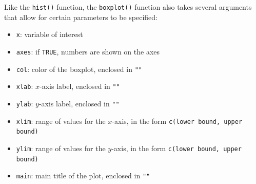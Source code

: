 \documentclass{report}\usepackage[]{graphicx}\usepackage[]{color}
\begin{document}
Like the \texttt{hist()} function, the \texttt{boxplot()} function also takes several arguments that allow for certain parameters to be specified:
\begin{itemize}
\item \texttt{x}: variable of interest
\item \texttt{axes}: if \texttt{TRUE}, numbers are shown on the axes
\item \texttt{col}: color of the boxplot, enclosed in \texttt{""}
\item \texttt{xlab}: $x$-axis label, enclosed in \texttt{""}
\item \texttt{ylab}: $y$-axis label, enclosed in \texttt{""}
\item \texttt{xlim}: range of values for the $x$-axis, in the form \texttt{c(lower bound, upper bound)}
\item \texttt{ylim}: range of values for the $y$-axis, in the form \texttt{c(lower bound, upper bound)}
\item \texttt{main}: main title of the plot, enclosed in \texttt{""} 

\end{itemize}


\end{document}
